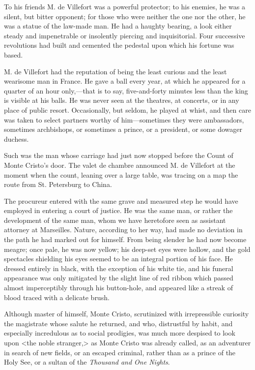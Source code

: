  To his friends M. de Villefort was a powerful protector; to his enemies, he was a silent, but bitter opponent; for those who were neither the one nor the other, he was a statue of the law-made man. He had a haughty bearing, a look either steady and impenetrable or insolently piercing and inquisitorial. Four successive revolutions had built and cemented the pedestal upon which his fortune was based. 

 M. de Villefort had the reputation of being the least curious and the least wearisome man in France. He gave a ball every year, at which he appeared for a quarter of an hour only,—that is to say, five-and-forty minutes less than the king is visible at his balls. He was never seen at the theatres, at concerts, or in any place of public resort. Occasionally, but seldom, he played at whist, and then care was taken to select partners worthy of him—sometimes they were ambassadors, sometimes archbishops, or sometimes a prince, or a president, or some dowager duchess. 

 Such was the man whose carriage had just now stopped before the Count of Monte Cristo's door. The valet de chambre announced M. de Villefort at the moment when the count, leaning over a large table, was tracing on a map the route from St. Petersburg to China. 

 The procureur entered with the same grave and measured step he would have employed in entering a court of justice. He was the same man, or rather the development of the same man, whom we have heretofore seen as assistant attorney at Marseilles. Nature, according to her way, had made no deviation in the path he had marked out for himself. From being slender he had now become meagre; once pale, he was now yellow; his deep-set eyes were hollow, and the gold spectacles shielding his eyes seemed to be an integral portion of his face. He dressed entirely in black, with the exception of his white tie, and his funeral appearance was only mitigated by the slight line of red ribbon which passed almost imperceptibly through his button-hole, and appeared like a streak of blood traced with a delicate brush. 

 Although master of himself, Monte Cristo, scrutinized with irrepressible curiosity the magistrate whose salute he returned, and who, distrustful by habit, and especially incredulous as to social prodigies, was much more despised to look upon <the noble stranger,> as Monte Cristo was already called, as an adventurer in search of new fields, or an escaped criminal, rather than as a prince of the Holy See, or a sultan of the \textit{Thousand and One Nights}. 

